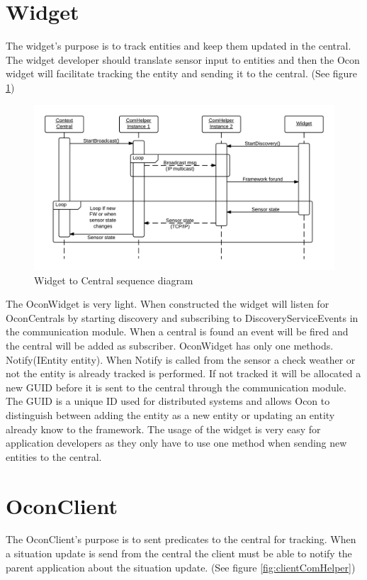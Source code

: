 \documentclass[../report.tex]{subfiles}
\begin{document}
\section{Widget}
\label{sec:OconWidget}

The widget's purpose is to track entities and keep them updated in the central. The widget developer should translate sensor input to entities and then the Ocon widget will facilitate tracking the entity and sending it to the central. (See figure \ref{fig:widgetComHelper})

\begin{figure}
\hspace{-70px}
\includegraphics[width=500px]{comHelperSequence-widget.png}
\caption{Widget to Central sequence diagram}
\label{fig:widgetComHelper}
\end{figure}

The OconWidget is very light. When constructed the widget will listen for OconCentrals by starting discovery and subscribing to DiscoveryServiceEvents in the communication module. When a central is found an event will be fired and the central will be added as subscriber. OconWidget has only one methods. Notify(IEntity entity). When Notify is called from the sensor a check weather or not the entity is already tracked is performed. If not tracked it will be allocated a new GUID before it is sent to the central through the communication module. The GUID is a unique ID used for distributed systems and allows Ocon to distinguish between adding the entity as a new entity or updating an entity already know to the framework. The usage of the widget is very easy for application developers as they only have to use one method when sending new entities to the central.

\section{OconClient}
The OconClient's purpose is to sent predicates to the central for tracking. When a situation update is send from the central the client must be able to notify the parent application about the situation update. (See figure \ref{fig:clientComHelper})
\end{document}
